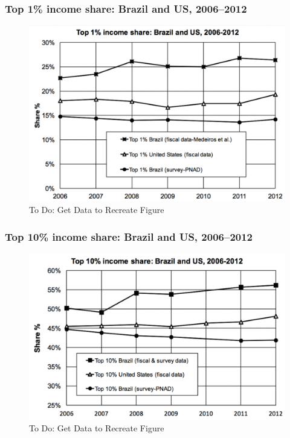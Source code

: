 \documentclass[t]{beamer}\usepackage[]{graphicx}\usepackage[]{color}
\begin{document}
\begin{frame}[label=BrazilUSTop1]
\frametitle{Top 1\% income share: Brazil and US, 2006--2012}
\begin{figure}[t]
\begin{minipage}[b]{\textwidth}
\centering
\includegraphics[width=\textwidth]
{pictures/Top1BrazilVsUSA}
\caption{To Do: Get Data to Recreate Figure}
\end{minipage}
\end{figure}
\end{frame}


\begin{frame}[label=BrazilUSTop10]
\frametitle{Top 10\% income share: Brazil and US, 2006--2012}
\begin{figure}[t]
\begin{minipage}[b]{\textwidth}
\centering
\includegraphics[width=\textwidth]
{pictures/Top10BrazilVsUSA}
\caption{To Do: Get Data to Recreate Figure}
\end{minipage}
\end{figure}
\end{frame}
\end{document}
